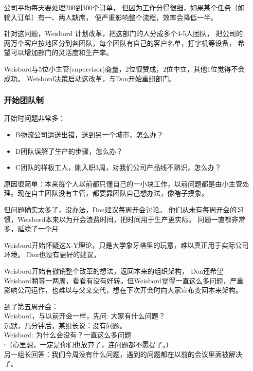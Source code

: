 公司平均每天要处理200到300个订单，
但因为工作分得很细，如果某个任务（如输入订单）有一、两人缺席，
便严重影响整个流程，效率会降低一半。

针对这问题，Weisbord 计划改革，把这部门的人分成多个4-5人团队，
把公司的两万个客户按地区分到各团队，每个团队有自己的客户名单，打字机等设备，
希望可以增加部门的灵活度和生产率。

Weisbord与5位小主管(supervisor)商量，2位很赞成，2位中立，其他1位觉得不会成功。
Weisbord决策启动这改革，与Don开始重组部门。

\hypertarget{ux5f00ux59cbux56e2ux961fux5236}{%
\subsubsection{开始团队制}\label{ux5f00ux59cbux56e2ux961fux5236}}

开始时问题非常多：

\begin{itemize}
\tightlist
\item
  B物流公司运送出错，送到另一个城市，怎么办？
\item
  D团队误解了生产的步骤，怎么办？
\item
  C团队的样板工人，刚入职3周，对我们公司产品线不熟识，怎么办？
\end{itemize}

原因很简单：本来每个人以前都只懂自己的一小块工作，以前问题都是由小主管处理。现在自主团队没有主管，都要靠团队自己想办法，像瞎子摸象。

但问题确实太多了，没办法，Don建议每周开会讨论。
他们从未有每周开会的习惯，Weisbord本来以为开会浪费时间，把时间用于生产更实际。
问题一直都非常多，延续了一个月

Weisbord开始怀疑这X-Y理论，只是大学象牙塔里的玩意，难以真正用于实际公司环境。
Don也没有更好的建议。

Weisbord开始有撤销整个改革的想法，返回本来的组织架构，
Don还希望Weisbord稍等一两周，看看有没有好转。但Weisbord觉得一直这么多问题，严重影响公司运作，也难以与父亲交代，想在下次开会时向大家宣布变回本来架构。

到了第五周开会：\\
Weisbord，与以前开会一样，先问: 大家有什么问题？\\
沉默，几分钟后，某组长说：没有问题。\\
Weisbord: 为什么会没有？一直这么多问题\\
:（心里想，一定是你们也放弃了，连问题都不愿提了。）\\
另一组长回答：我们今周没有什么问题，遇到的问题都在以前的会议里面被解决了。\\

